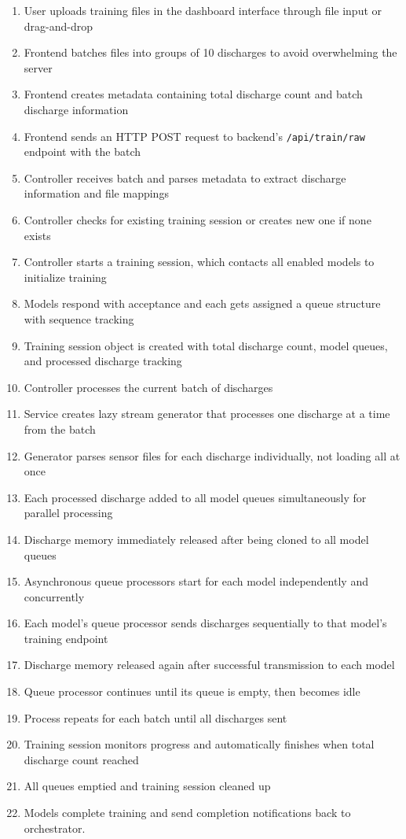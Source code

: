 \begin{enumerate}
    \item User uploads training files in the dashboard interface through file input or drag-and-drop
    \item Frontend batches files into groups of 10 discharges to avoid overwhelming the server
    \item Frontend creates metadata containing total discharge count and batch discharge information
    \item Frontend sends an \ac{HTTP} POST request to backend's \texttt{/api/train/raw} endpoint with the batch
    \item Controller receives batch and parses metadata to extract discharge information and file mappings
    \item Controller checks for existing training session or creates new one if none exists
    \item Controller starts a training session, which contacts all enabled models to initialize training
    \item Models respond with acceptance and each gets assigned a queue structure with sequence tracking
    \item Training session object is created with total discharge count, model queues, and processed discharge tracking
    \item Controller processes the current batch of discharges
    \item Service creates lazy stream generator that processes one discharge at a time from the batch
    \item Generator parses sensor files for each discharge individually, not loading all at once
    \item Each processed discharge added to all model queues simultaneously for parallel processing
    \item Discharge memory immediately released after being cloned to all model queues
    \item Asynchronous queue processors start for each model independently and concurrently
    \item Each model's queue processor sends discharges sequentially to that model's training endpoint
    \item Discharge memory released again after successful transmission to each model
    \item Queue processor continues until its queue is empty, then becomes idle
    \item Process repeats for each batch until all discharges sent
    \item Training session monitors progress and automatically finishes when total discharge count reached
    \item All queues emptied and training session cleaned up
    \item Models complete training and send completion notifications back to orchestrator.
\end{enumerate}


